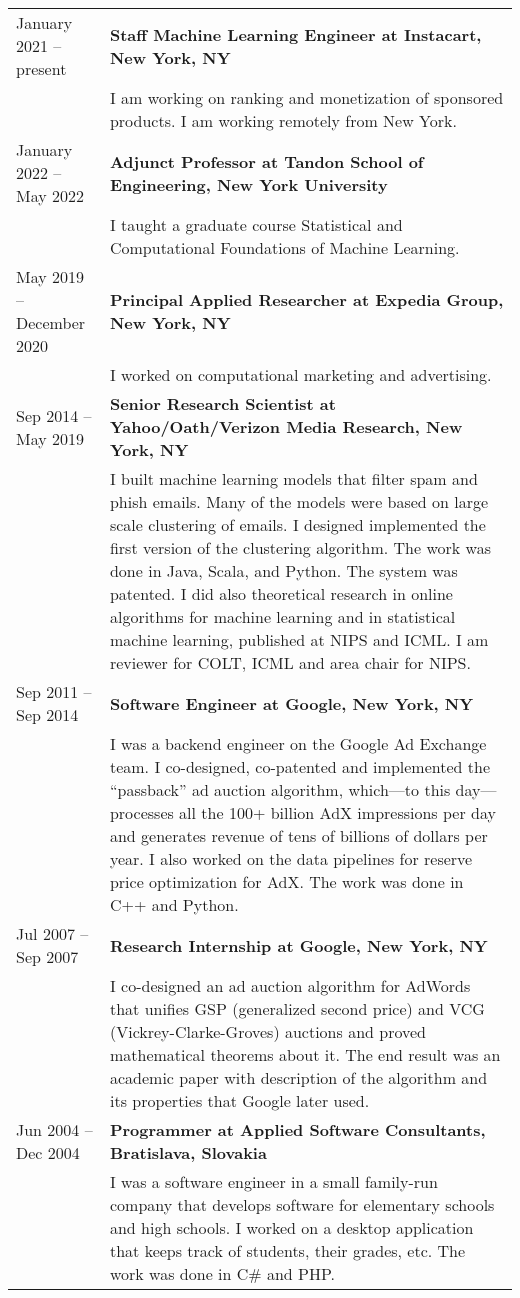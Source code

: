 \documentclass[9pt]{article}
\newcommand{\smallfont}{\small}
\begin{document}
\begin{longtable}{@{}lp{13cm}}
January 2021 -- present & \textbf{Staff Machine Learning Engineer at Instacart, New York, NY} \\
& {\smallfont I am working on ranking and monetization of sponsored products. I
am working remotely from New York.}
\\[0.3cm]
January 2022 -- May 2022 & \textbf{Adjunct Professor at Tandon School of Engineering, New York University} \\
& {\smallfont I taught a graduate course Statistical and Computational
Foundations of Machine Learning.}
\\[0.3cm]
May 2019 -- December 2020 & \textbf{Principal Applied Researcher at Expedia Group, New York, NY} \\
& {\smallfont I worked on computational marketing and advertising.}
\\[0.3cm]
Sep 2014 -- May 2019 & \textbf{Senior Research Scientist at Yahoo/Oath/Verizon Media Research, New York, NY} \\
& {\smallfont I built machine learning models that filter spam and phish emails.
Many of the models were based on large scale clustering of emails. I designed
implemented the first version of the clustering algorithm. The work was done in
Java, Scala, and Python. The system was patented. I did also theoretical
research in online algorithms for machine learning and in statistical machine
learning, published at NIPS and ICML. I am reviewer for COLT, ICML and area
chair for NIPS.}
\\[0.3cm]
Sep 2011 -- Sep 2014 & \textbf{Software Engineer at Google, New York, NY} \\
& {\smallfont I was a backend engineer on the Google Ad Exchange team. I
co-designed, co-patented and implemented the ``passback'' ad auction algorithm,
which---to this day---processes all the 100+ billion AdX impressions per day and
generates revenue of tens of billions of dollars per year. I also worked on the
data pipelines for reserve price optimization for AdX. The work was done in C++
and Python.}
\\[0.3cm]
Jul 2007 -- Sep 2007 & \textbf{Research Internship at Google, New York, NY} \\
& {\smallfont I co-designed an ad auction algorithm for AdWords that unifies GSP
(generalized second price) and VCG (Vickrey-Clarke-Groves) auctions and proved
mathematical theorems about it. The end result was an academic paper with description
of the algorithm and its properties that Google later used.}
\\[0.3cm]
Jun 2004 -- Dec 2004 & \textbf{Programmer at Applied Software Consultants, Bratislava, Slovakia} \\
& {\smallfont I was a software engineer in a small family-run company that
develops software for elementary schools and high schools. I worked on a desktop
application that keeps track of students, their grades, etc. The work was done in
C\# and PHP.}
\end{longtable}
\end{document}
